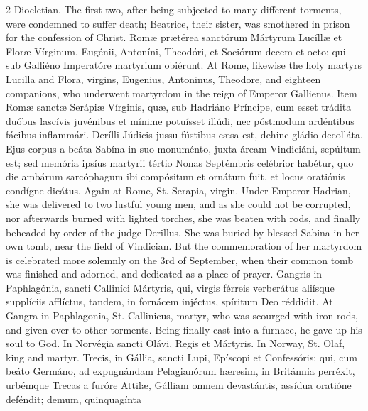 \begin{paracol}{2}
 Diocletian. The first two, after being subjected to many different 
 torments, were condemned to suffer death; Beatrice, their sister, was 
 smothered in prison for the confession of Christ.
\switchcolumn*
{}
Romæ prætérea sanctórum 
 Mártyrum Lucíllæ et Floræ Vírginum, Eugénii, Antoníni, Theodóri, et Sociórum 
 decem et octo; qui sub Galliéno Imperatóre martyrium obiérunt.
\switchcolumn
{}
At Rome, likewise the holy martyrs 
 Lucilla and Flora, virgins, Eugenius, Antoninus, Theodore, and eighteen 
 companions, who underwent martyrdom in the reign of Emperor Gallienus.
\switchcolumn*
{}
Item Romæ sanctæ 
 Serápiæ Vírginis, quæ, sub Hadriáno Príncipe, cum esset trádita duóbus 
 lascívis juvénibus et mínime potuísset illúdi, nec póstmodum ardéntibus 
 fácibus inflammári. Derílli Júdicis jussu fústibus cæsa est, dehinc 
 gládio decolláta. Ejus corpus a beáta Sabína in suo monuménto, juxta áream Vindiciáni, sepúltum est; sed memória ipsíus martyrii tértio Nonas 
 Septémbris celébrior habétur, quo die ambárum sarcóphagum ibi compósitum et 
 ornátum fuit, et locus oratiónis condígne dicátus.
\switchcolumn
{}
Again at Rome, St. Serapia, virgin. 
 Under Emperor Hadrian, she was delivered to two lustful young men, and as 
 she could not be corrupted, nor afterwards burned with lighted torches, she 
 was beaten with rods, and finally beheaded by order of the judge Derillus. 
 She was buried by blessed Sabina in her own tomb, near the field of 
 Vindician. But the commemoration of her martyrdom is celebrated more 
 solemnly on the 3rd of September, when their common tomb was finished and 
 adorned, and dedicated as a place of prayer.
\switchcolumn*
{}
Gangris in Paphlagónia, 
 sancti Calliníci Mártyris, qui, virgis férreis verberátus aliísque 
 supplíciis afflíctus, tandem, in fornácem injéctus, spíritum Deo réddidit.
\switchcolumn
{}
At Gangra in Paphlagonia, St. 
 Callinicus, martyr, who was scourged with iron rods, and given over to other 
 torments. Being finally cast into a furnace, he gave up his soul to 
 God.
\switchcolumn*
{}
In Norvégia sancti 
 Olávi, Regis et Mártyris.
\switchcolumn
{}
In Norway, St. Olaf, king and 
 martyr.
\switchcolumn*
{}
Trecis, in Gállia, 
 sancti Lupi, Epíscopi et Confessóris; qui, cum beáto Germáno, ad expugnándam 
 Pelagianórum hæresim, in Británnia perréxit, urbémque Trecas a furóre Attilæ, 
 Gálliam omnem devastántis, assídua oratióne deféndit; demum, quinquagínta 

\end{paracol}
